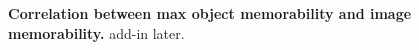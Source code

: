 \begin{figure}[t]
\centering
{}
\vspace{-5mm}\caption{\footnotesize\textbf{Correlation between max object memorability and image memorability.} add-in later. }\label{fig:maxMem_scatter}
\end{figure}